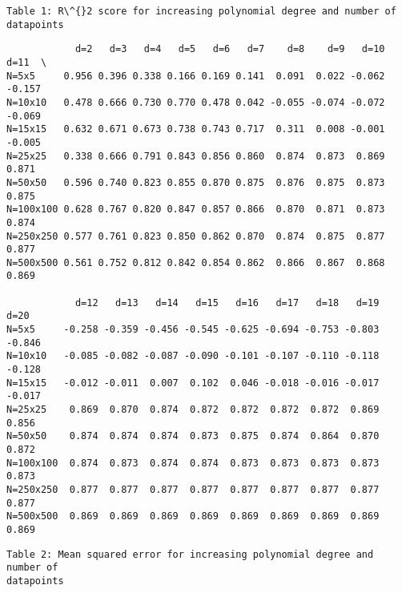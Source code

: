 \documentclass[11pt]{article}
\begin{document}
    \begin{Verbatim}[commandchars=\\\{\}]
Table 1: R\^{}2 score for increasing polynomial degree and number of datapoints
    \end{Verbatim}

    
    \begin{verbatim}
            d=2   d=3   d=4   d=5   d=6   d=7    d=8    d=9   d=10   d=11  \
N=5x5     0.956 0.396 0.338 0.166 0.169 0.141  0.091  0.022 -0.062 -0.157   
N=10x10   0.478 0.666 0.730 0.770 0.478 0.042 -0.055 -0.074 -0.072 -0.069   
N=15x15   0.632 0.671 0.673 0.738 0.743 0.717  0.311  0.008 -0.001 -0.005   
N=25x25   0.338 0.666 0.791 0.843 0.856 0.860  0.874  0.873  0.869  0.871   
N=50x50   0.596 0.740 0.823 0.855 0.870 0.875  0.876  0.875  0.873  0.875   
N=100x100 0.628 0.767 0.820 0.847 0.857 0.866  0.870  0.871  0.873  0.874   
N=250x250 0.577 0.761 0.823 0.850 0.862 0.870  0.874  0.875  0.877  0.877   
N=500x500 0.561 0.752 0.812 0.842 0.854 0.862  0.866  0.867  0.868  0.869   

            d=12   d=13   d=14   d=15   d=16   d=17   d=18   d=19   d=20  
N=5x5     -0.258 -0.359 -0.456 -0.545 -0.625 -0.694 -0.753 -0.803 -0.846  
N=10x10   -0.085 -0.082 -0.087 -0.090 -0.101 -0.107 -0.110 -0.118 -0.128  
N=15x15   -0.012 -0.011  0.007  0.102  0.046 -0.018 -0.016 -0.017 -0.017  
N=25x25    0.869  0.870  0.874  0.872  0.872  0.872  0.872  0.869  0.856  
N=50x50    0.874  0.874  0.874  0.873  0.875  0.874  0.864  0.870  0.872  
N=100x100  0.874  0.873  0.874  0.874  0.873  0.873  0.873  0.873  0.873  
N=250x250  0.877  0.877  0.877  0.877  0.877  0.877  0.877  0.877  0.877  
N=500x500  0.869  0.869  0.869  0.869  0.869  0.869  0.869  0.869  0.869  
    \end{verbatim}

    
    \begin{Verbatim}[commandchars=\\\{\}]
Table 2: Mean squared error for increasing polynomial degree and number of
datapoints
    \end{Verbatim}
\end{document}
